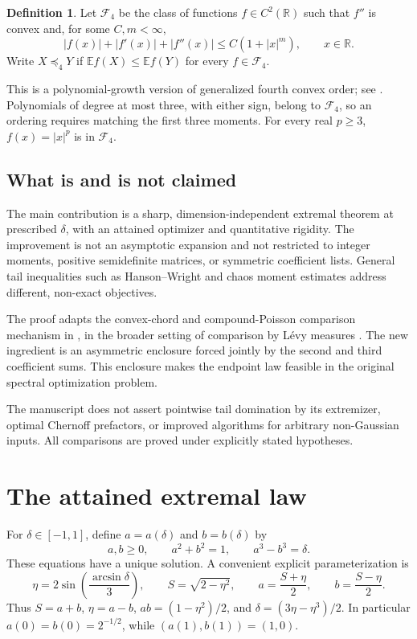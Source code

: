 \documentclass[11pt]{article}
\numberwithin{equation}{section}
\theoremstyle{definition}
\newtheorem{definition}[theorem]{Definition}
\theoremstyle{remark}
\newcommand{\E}{\mathbb E}
\newcommand{\R}{\mathbb R}
\newcommand{\fourth}{\mathcal F_4}
\begin{document}
\begin{definition}\label{def:F4}
Let $\fourth$ be the class of functions $f\in C^2(\R)$ such that $f''$ is convex and, for some $C,m<\infty$,
\[
|f(x)|+|f'(x)|+|f''(x)|\leq C(1+|x|^m),\qquad x\in\R.
\]
Write $X\preceq_4 Y$ if $\E f(X)\leq\E f(Y)$ for every $f\in\fourth$.
\end{definition}
This is a polynomial-growth version of generalized fourth convex order; see \cite{Denuit1998}. Polynomials of degree at most three, with either sign, belong to $\fourth$, so an ordering requires matching the first three moments. For every real $p\geq3$, $f(x)=|x|^p$ is in $\fourth$.

\subsection{What is and is not claimed}
The main contribution is a sharp, dimension-independent extremal theorem at prescribed $\delta$, with an attained optimizer and quantitative rigidity. The improvement is not an asymptotic expansion and not restricted to integer moments, positive semidefinite matrices, or symmetric coefficient lists. General tail inequalities such as Hanson--Wright and chaos moment estimates \cite{HansonWright1971,RudelsonVershynin2013,Latala2006} address different, non-exact objectives.

The proof adapts the convex-chord and compound-Poisson comparison mechanism in \cite{Pang2026}, in the broader setting of comparison by L\'evy measures \cite{Bergenthum2007}. The new ingredient is an asymmetric enclosure forced jointly by the second and third coefficient sums. This enclosure makes the endpoint law feasible in the original spectral optimization problem.

The manuscript does not assert pointwise tail domination by its extremizer, optimal Chernoff prefactors, or improved algorithms for arbitrary non-Gaussian inputs. All comparisons are proved under explicitly stated hypotheses.

\section{The attained extremal law}
\label{sec:main}

For $\delta\in[-1,1]$, define $a=a(\delta)$ and $b=b(\delta)$ by
\begin{equation}\label{eq:ab}
a,b\geq0,\qquad a^2+b^2=1,\qquad a^3-b^3=\delta.
\end{equation}
These equations have a unique solution. A convenient explicit parameterization is
\begin{equation}\label{eq:trig}
\eta=2\sin\!\left(\frac{\arcsin\delta}{3}\right),\qquad
S=\sqrt{2-\eta^2},\qquad
 a=\frac{S+\eta}{2},\qquad b=\frac{S-\eta}{2}.
\end{equation}
Thus $S=a+b$, $\eta=a-b$, $ab=(1-\eta^2)/2$, and
$\delta=(3\eta-\eta^3)/2$. In particular $a(0)=b(0)=2^{-1/2}$, while $(a(1),b(1))=(1,0)$.
\end{document}

